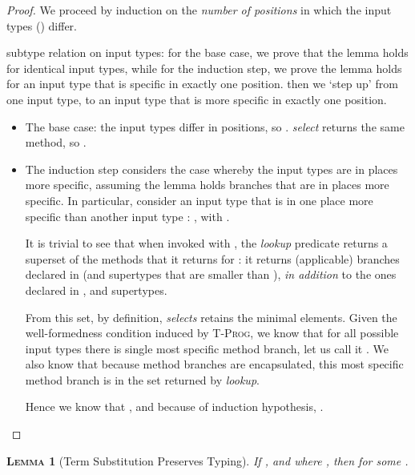 \documentclass[11pt]{article}
\newtheorem{lemma}{\textsc{Lemma}}[section]
\begin{document}
\begin{proof}
	
\noindent We proceed by induction on the \emph{number of positions} in which the input types () differ.

subtype relation on input types: for the base case, we prove that the lemma holds for identical input types, while for the induction step, we prove the lemma holds for an input type that is specific in exactly one position.  then we `step up' from one input type, to an input type that is more specific in exactly one position.

\begin{itemize}
	\item The base case: the input types differ in  positions, so . \emph{select} returns the same method, so .
	
	\item The induction step considers the case whereby the input types are in  places more specific, assuming the lemma holds branches that are in  places more specific. In particular, consider an input type  that is in one place more specific than another input type : , with .

	It is trivial to see that when invoked with , the \emph{lookup} predicate returns a superset of the methods that it returns for : it returns (applicable) branches declared in  (and supertypes that are smaller than ), \emph{in addition} to the ones declared in , and supertypes.

	From this set, by definition, \emph{selects} retains the minimal elements. Given the well-formedness condition induced by \textsc{T-Prog}, we know that for all possible input types there is single most specific method branch, let us call it . We also know that because method branches are encapsulated, this most specific method branch is in the set returned by \emph{lookup}.

Hence we know that , and because of induction hypothesis, .
	
\end{itemize}
	
\end{proof}

\medskip

\noindent\begin{lemma}[Term Substitution Preserves Typing] If , and  where , then  for some .
\end{lemma}
\end{document}
